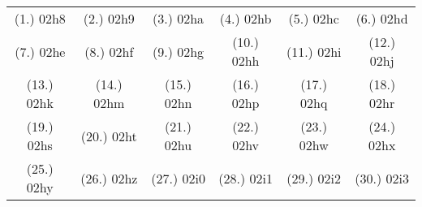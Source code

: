 \begin{exercises}{}
{%
\par \practiceinfo
\par \begin{tabular}[h]{cccccc}
(1.)	02h8	&
(2.)	02h9	&
(3.)	02ha	&
(4.)	02hb	&
(5.)	02hc	&
(6.)	02hd	\\ %
(7.)	02he	&
(8.)	02hf	&
(9.)	02hg	&
(10.)	02hh	&
(11.)	02hi	&
(12.)	02hj	\\ %
(13.)	02hk	&
(14.)	02hm	&
(15.)	02hn	&
(16.)	02hp	&
(17.)	02hq	&
(18.)	02hr	\\ %
(19.)	02hs	&
(20.)	02ht	&
(21.)	02hu	&
(22.)	02hv	&
(23.)	02hw	&
(24.)	02hx	\\ %
(25.)	02hy	&
(26.)	02hz	&
(27.)	02i0	&
(28.)	02i1	&
(29.)	02i2	&
(30.)	02i3	\\ %
\end{tabular}
}
\end{exercises}



